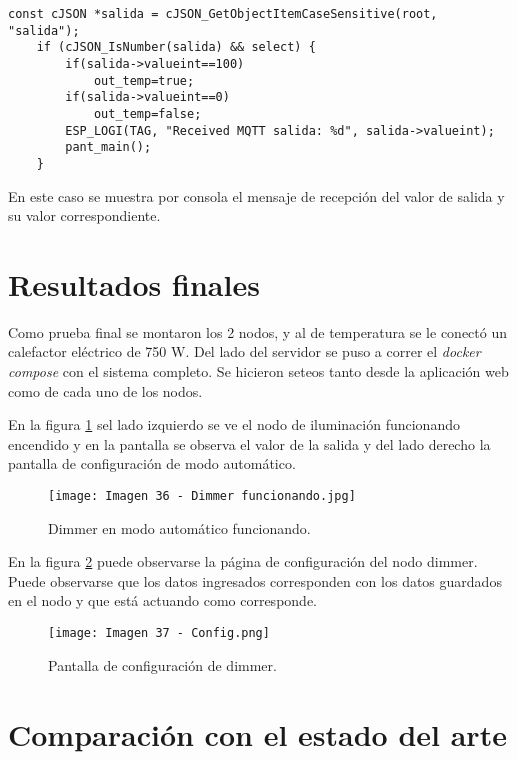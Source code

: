 
\begin{lstlisting}[caption={Muestra por consola de la terminal ESP-IDF}, label={lst:dispositivo}]
const cJSON *salida = cJSON_GetObjectItemCaseSensitive(root, "salida");
    if (cJSON_IsNumber(salida) && select) {
        if(salida->valueint==100)
            out_temp=true;
        if(salida->valueint==0)
            out_temp=false;
        ESP_LOGI(TAG, "Received MQTT salida: %d", salida->valueint);
        pant_main();
    }
\end{lstlisting}

En este caso se muestra por consola el mensaje de recepción del valor de salida y su valor correspondiente.

\section{Resultados finales}

Como prueba final se montaron los 2 nodos, y al de temperatura se le conectó un calefactor eléctrico de 750 W. Del lado del servidor se puso a correr el \textit{docker compose} con el sistema completo. Se hicieron seteos tanto desde la aplicación web como de cada uno de los nodos.

En la figura \ref{fig:36} sel lado izquierdo se ve el nodo de iluminación funcionando encendido y en la pantalla se observa el valor de la salida y del lado derecho la pantalla de configuración de modo automático.

\begin{figure}[h]
\centering
\texttt{[image: Imagen 36 - Dimmer funcionando.jpg]}
\caption[MQTTX]{Dimmer en modo automático funcionando.}
\label{fig:36}
\end{figure}

En la figura \ref{fig:37} puede observarse la página de configuración del nodo dimmer. Puede observarse que los datos ingresados corresponden con los datos guardados en el nodo y que está actuando como corresponde.

\begin{figure}[h]
\centering
\texttt{[image: Imagen 37 - Config.png]}
\caption[MQTTX]{Pantalla de configuración de dimmer.}
\label{fig:37}
\end{figure}



\section{Comparación con el estado del arte}